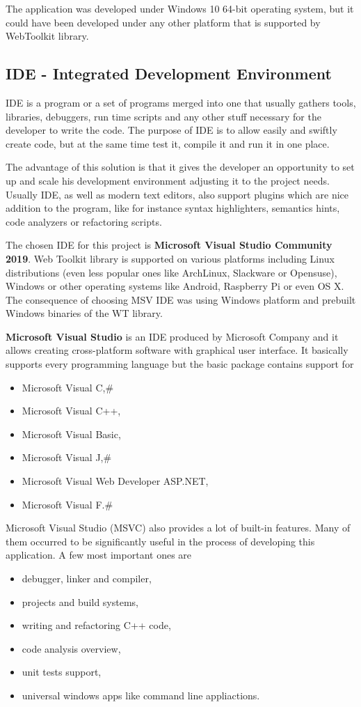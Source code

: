 \documentclass[a4paper,12pt]{book}
\makeatletter
\newcommand{\ttvar}{\begingroup\@makeother\#\@ttvar}
\newcommand{\@ttvar}[1]{\ttfamily\detokenize{#1}\endgroup}
\newcommand\tab[1][1cm]{\hspace*{#1}}
\makeatother
\begin{document}
{The application was developed under Windows 10 64-bit operating system, but it could have been developed under any other platform that is supported by WebToolkit library.

\newpage
\subsection*{IDE - Integrated Development Environment}
{
\tab IDE is a program or a set of programs merged into one that usually gathers tools, libraries, debuggers, run time scripts and any other stuff necessary for the developer to write the code. The purpose of IDE is to allow easily and swiftly create code, but at the same time test it, compile it and run it in one place. 

\bigskip
The advantage of this solution is that it gives the developer an opportunity to set up and scale his development environment adjusting it to the project needs. Usually IDE, as well as modern text editors, also support plugins which are nice addition to the program, like for instance syntax highlighters, semantics hints, code analyzers or refactoring scripts.

\bigskip
The chosen IDE for this project is \textbf{Microsoft Visual Studio Community 2019}. Web Toolkit library is supported on various platforms including Linux distributions (even less popular ones like ArchLinux, Slackware or Opensuse), Windows or other operating systems like Android, Raspberry Pi or even OS X. The consequence of choosing MSV IDE was using Windows platform and prebuilt Windows binaries of the WT library.

\bigskip
\textbf{Microsoft Visual Studio} is an IDE produced by Microsoft Company and it allows creating cross-platform software with graphical user interface. It basically supports every programming language but the basic package contains support for 
\begin{itemize}
	\item Microsoft Visual C,\ttvar{#}
	\item Microsoft Visual C++,
	\item Microsoft Visual Basic,
	\item Microsoft Visual J,\ttvar{#}
	\item Microsoft Visual Web Developer ASP.NET,
	\item Microsoft Visual F.\ttvar{#}
\end{itemize}

Microsoft Visual Studio (MSVC) also provides a lot of built-in features. Many of them occurred to be significantly useful in the process of developing this application. A few most important ones are
\begin{itemize}
	\item debugger, linker and compiler,
	\item projects and build systems,
	\item writing and refactoring C++ code,
	\item code analysis overview,
	\item unit tests support,
	\item universal windows apps like command line appliactions.
\end{itemize}

}}
\end{document}
